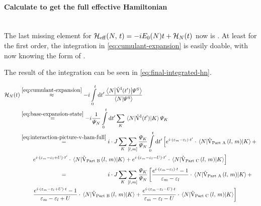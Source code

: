 \paragraph*{Calculate \HNOft to get the full effective Hamiltonian}\makebox{}\\

The last missing element for ${\mathcal{H}_\text{eff}}^{}({N},\,t) = -i E_0(N) t + \mathcal{H}_{N}(t)$ now is \HNOft.
At least for the first order, the integration in \autoref{eq:cumulant-expansion} is easily doable, with now knowing the form of .

The result of the integration can be seen in \autoref{eq:final-integrated-hn}.

\begin{equation}
    \label{eq:final-integrated-hn}
    \begin{split}
        \HNOft &\stackrel{\ref{eq:cumulant-expansion}}{\approx} -i \int\limits_0^t \mathrm{d}t' \frac{\bracketHelper{N}{\VhamiltonianOf[\interactionPicture]{t'}}{\picturePsi[\schroedingerPicture]{}}}{\braketHelper{N}{\picturePsi[\schroedingerPicture]{}}}\\
        &\stackrel{\ref{eq:base-expansion-state}}{=}
        -i \frac{1}{\psiN} \int\limits_0^t \mathrm{d}t' \lsum[K] \bracketHelper{N}{\VhamiltonianOf[\interactionPicture]{t'}}{K} \psiN[K]\\
        &\stackrel{\ref{eq:interaction-picture-v-ham-full}}{=}
        i \cdot J \lsum[K] \fullneighborsum{l}{m} \frac{\psiN[K]}{\psiN} \int\limits_0^t \mathrm{d}t' 
        \left[
            e^{i\cdot \left(\epsl[m]-\epsl\right)\cdot t'} \cdot 
            \bracketHelper{N}{
                \VhamiltonianPartA{l}{m} 
            }{K}
            + 
            \right.\\
            &\qquad
            \left.
            e^{i\cdot \left(\epsl[m]-\epsl + U\right)\cdot t'} \cdot 
            \bracketHelper{N}{
                \VhamiltonianPartB{l}{m}
            }{K}
            + 
            e^{i\cdot \left(\epsl[m]-\epsl - U\right)\cdot t'} \cdot 
            \bracketHelper{N}{
                \VhamiltonianPartC{l}{m} 
            }{K}
        \right]
        \\
        &\stackrel{\phantom{\ref{eq:interaction-picture-v-ham-full}}}{=}
        i \cdot J \lsum[K] \fullneighborsum{l}{m} \frac{\psiN[K]}{\psiN}
        \left[
            \frac{e^{i\cdot \left(\epsl[m]-\epsl\right)\cdot t}-1}{\epsl[m]-\epsl} \cdot 
            \bracketHelper{N}{
                \VhamiltonianPartA{l}{m} 
            }{K}
            + 
            \right.\\
            &\qquad
            \left.
            \frac{
                e^{i\cdot \left(\epsl[m]-\epsl + U\right)\cdot t}-1
            }{\epsl[m]-\epsl + U}
             \cdot 
            \bracketHelper{N}{
                \VhamiltonianPartB{l}{m}
            }{K}
            + 
            \frac{
                e^{i\cdot \left(\epsl[m]-\epsl - U\right)\cdot t}
            }{\epsl[m]-\epsl - U}
             \cdot 
            \bracketHelper{N}{
                \VhamiltonianPartC{l}{m} 
            }{K}
        \right]
    \end{split}
\end{equation}

